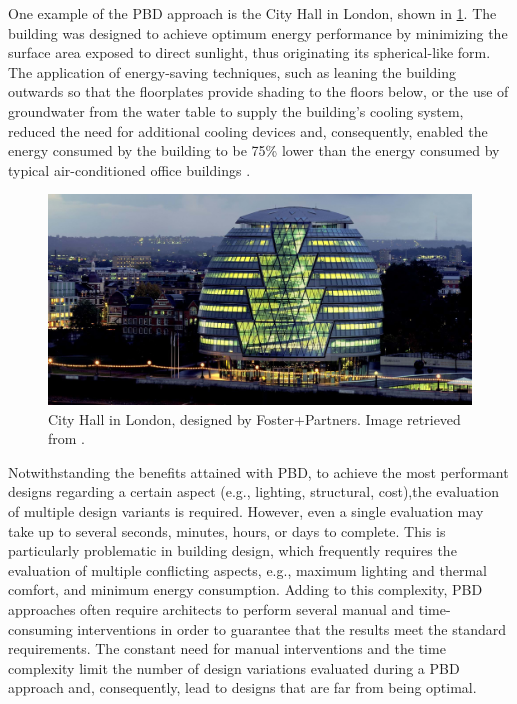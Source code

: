 	One example of the \ac{PBD} approach is the City Hall in London, shown in \cref{fig:cityhalllondon}. The building was designed to achieve optimum energy performance by minimizing the surface area exposed to direct sunlight, thus originating its spherical-like form. The application of energy-saving techniques, such as leaning the building outwards so that the floorplates provide shading to the floors below, or the use of groundwater from the water table to supply the building's cooling system, reduced the need for additional cooling devices and, consequently, enabled the energy consumed by the building to be 75\% lower than the energy consumed by typical air-conditioned office buildings \cite{Malkawi2005}.
	\begin{figure}[htbp]
		\centering
		\includegraphics[width=\textwidth]{./Images/Introduction/cityhalllondon.jpg}
		\caption[City Hall in London, designed by Foster and Partners]{City Hall in London, designed by Foster+Partners. Image retrieved from \cite{londoncityhall}.}
		\label{fig:cityhalllondon}
	\end{figure}

	Notwithstanding the benefits attained with \ac{PBD}, to achieve the most performant designs regarding a certain aspect (e.g., lighting, structural, cost),the evaluation of multiple design variants is required. However, even a single evaluation may take up to several seconds, minutes, hours, or days to complete. This is particularly problematic in building design, which frequently requires the evaluation of multiple conflicting aspects, e.g., maximum lighting and thermal comfort, and minimum energy consumption. Adding to this complexity, \ac{PBD} approaches often require architects to perform several manual and time-consuming interventions in order to guarantee that the results meet the standard requirements. The constant need for manual interventions and the time complexity limit the number of design variations evaluated during a \ac{PBD} approach and, consequently, lead to designs that are far from being optimal.  
	
